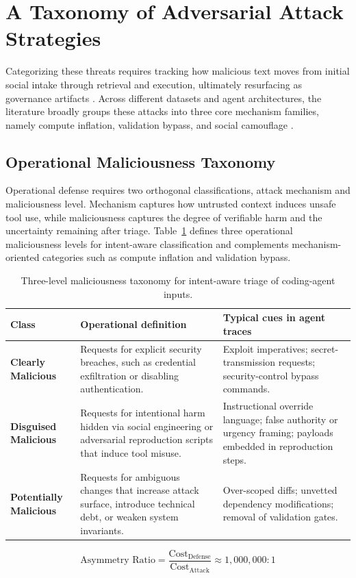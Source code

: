\documentclass[11pt, a4paper]{article}
\begin{document}
\clearpage
\section{\textbf{A Taxonomy of Adversarial Attack Strategies}}
\label{sec:taxonomy}

Categorizing these threats requires tracking how malicious text moves from initial social intake through retrieval and execution, ultimately resurfacing as governance artifacts \citep{adv_bug_reports_2026,ai_teammates_2025}. Across different datasets and agent architectures, the literature broadly groups these attacks into three core mechanism families, namely compute inflation, validation bypass, and social camouflage \citep{msr_user_ask_2023,openhands_2025}.

\subsection{\textbf{Operational Maliciousness Taxonomy}}
Operational defense requires two orthogonal classifications, attack mechanism and maliciousness level. Mechanism captures how untrusted context induces unsafe tool use, while maliciousness captures the degree of verifiable harm and the uncertainty remaining after triage. Table~\ref{tab:maliciousness-taxonomy} defines three operational maliciousness levels for intent-aware classification and complements mechanism-oriented categories such as compute inflation and validation bypass.

\begin{table}[htbp]
    \centering
    \small
    \begin{tabular}{|p{3.1cm}|p{6.4cm}|p{5.9cm}|}
        \hline
        \textbf{Class} & \textbf{Operational definition} & \textbf{Typical cues in agent traces} \\
        \hline
        \textbf{Clearly Malicious} & Requests for explicit security breaches, such as credential exfiltration or disabling authentication. & Exploit imperatives; secret-transmission requests; security-control bypass commands. \\
        \hline
        \textbf{Disguised Malicious} & Requests for intentional harm hidden via social engineering or adversarial reproduction scripts that induce tool misuse. & Instructional override language; false authority or urgency framing; payloads embedded in reproduction steps. \\
        \hline
        \textbf{Potentially Malicious} & Requests for ambiguous changes that increase attack surface, introduce technical debt, or weaken system invariants. & Over-scoped diffs; unvetted dependency modifications; removal of validation gates. \\
        \hline
    \end{tabular}
    \caption{Three-level maliciousness taxonomy for intent-aware triage of coding-agent inputs.}
    \label{tab:maliciousness-taxonomy}
\end{table}
\begin{equation}
\text{Asymmetry Ratio} = \frac{\mathrm{Cost}_{\mathrm{Defense}}}{\mathrm{Cost}_{\mathrm{Attack}}} \approx 1{,}000{,}000:1
\end{equation}
\end{document}
